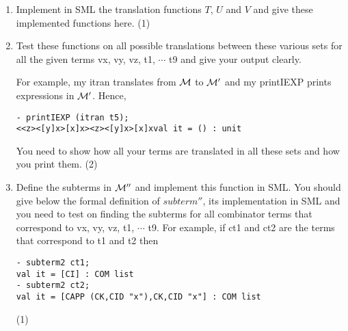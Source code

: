 \documentclass[11pt]{article}
\begin{document}
\begin{enumerate}
\begin{verbatim}
\end{verbatim}  
\item
Implement in SML the translation functions $T$, $U$ and $V$ and give these implemented functions here.
\hfill{(1)} %

\item
  Test these functions on all possible translations between these various sets for all the given terms vx, vy, vz, t1, $\cdots$ t9 and give your output clearly.

  For example, my itran translates from ${\cal M}$ to ${\cal M}'$ and my printIEXP prints expressions in ${\cal M}'$.  Hence,  
\begin{verbatim}
- printIEXP (itran t5);
<<z><[y]x>[x]x><z><[y]x>[x]xval it = () : unit
\end{verbatim}
You need to show how all your terms are translated in all these sets and how you print them.
\hfill{(2)} %



\item
  Define the subterms in ${\cal M}''$ and implement this function in SML.
  You should give below the formal definition of $subterm''$, its implementation   in SML and you need to test on finding the subterms for all combinator terms that correspond to  vx, vy, vz, t1, $\cdots$ t9.  For example, if ct1 and ct2  are the terms that correspond to t1 and t2 then
\begin{verbatim}
- subterm2 ct1;
val it = [CI] : COM list
- subterm2 ct2;
val it = [CAPP (CK,CID "x"),CK,CID "x"] : COM list
\end{verbatim}
 \hfill{(1)} %


\end{enumerate}
\end{document}
